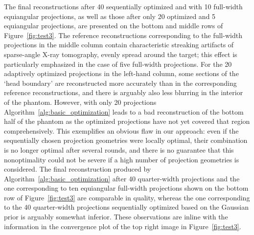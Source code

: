 \documentclass[final]{siamltex}
\begin{document}
The final reconstructions after 40 sequentially optimized and with 10 full-width equiangular projections, as well as those after only 20 optimized and 5 equiangular projections, are presented on the bottom and middle rows of Figure~\ref{fig:test3}. The reference reconstructions corresponding to the full-width projections in the middle column contain characteristic streaking artifacts of sparse-angle X-ray tomography, evenly spread around the target; this effect is particularly emphasized in the case of five full-width projections. For the 20 adaptively optimized projections in the left-hand column, some sections of the `head boundary' are reconstructed more accurately than in the corresponding reference reconstructions, and there is arguably also less blurring in the interior of the phantom. However, with only 20 projections Algorithm~\ref{alg:basic_optimization} leads to a bad reconstruction of the bottom half of the phantom as the optimized projections have not yet covered that region comprehensively. This exemplifies an obvious flaw in our approach: even if the sequentially chosen projection geometries were locally optimal, their combination is no longer optimal after several rounds, and there is no guarantee that this nonoptimality could not be severe if a high number of projection geometries is considered. The final reconstruction produced by Algorithm~\ref{alg:basic_optimization} after 40 quarter-width projections and the one corresponding to ten equiangular full-width projections shown on the bottom row of Figure~\ref{fig:test3} are comparable in quality, whereas the one corresponding to the 40 quarter-width projections sequentially optimized based on the Gaussian prior is arguably somewhat inferior. These observations are inline with the information in the convergence plot of the top right image in Figure~\ref{fig:test3}.
\end{document}
